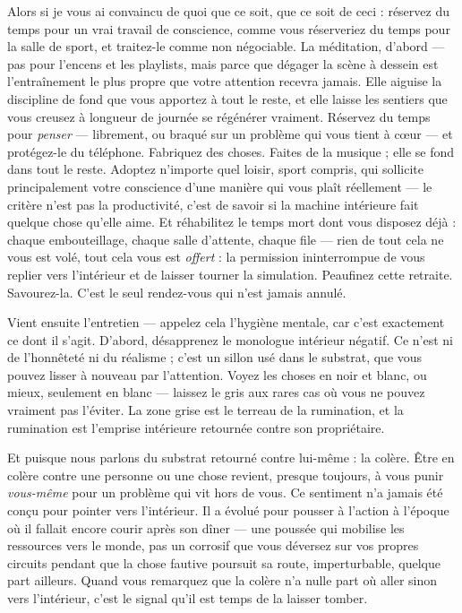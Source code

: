 \documentclass[11pt, twoside, openright]{book}
\begin{document}
Alors si je vous ai convaincu de quoi que ce soit, que ce soit de ceci : réservez du temps pour un vrai travail de conscience, comme vous réserveriez du temps pour la salle de sport, et traitez-le comme non négociable. La méditation, d'abord --- pas pour l'encens et les playlists, mais parce que dégager la scène à dessein est l'entraînement le plus propre que votre attention recevra jamais. Elle aiguise la discipline de fond que vous apportez à tout le reste, et elle laisse les sentiers que vous creusez à longueur de journée se régénérer vraiment. Réservez du temps pour \textit{penser} --- librement, ou braqué sur un problème qui vous tient à cœur --- et protégez-le du téléphone. Fabriquez des choses. Faites de la musique ; elle se fond dans tout le reste. Adoptez n'importe quel loisir, sport compris, qui sollicite principalement votre conscience d'une manière qui vous plaît réellement --- le critère n'est pas la productivité, c'est de savoir si la machine intérieure fait quelque chose qu'elle aime. Et réhabilitez le temps mort dont vous disposez déjà : chaque embouteillage, chaque salle d'attente, chaque file --- rien de tout cela ne vous est volé, tout cela vous est \textit{offert} : la permission ininterrompue de vous replier vers l'intérieur et de laisser tourner la simulation. Peaufinez cette retraite. Savourez-la. C'est le seul rendez-vous qui n'est jamais annulé.

Vient ensuite l'entretien --- appelez cela l'hygiène mentale, car c'est exactement ce dont il s'agit. D'abord, désapprenez le monologue intérieur négatif. Ce n'est ni de l'honnêteté ni du réalisme ; c'est un sillon usé dans le substrat, que vous pouvez lisser à nouveau par l'attention. Voyez les choses en noir et blanc, ou mieux, seulement en blanc --- laissez le gris aux rares cas où vous ne pouvez vraiment pas l'éviter. La zone grise est le terreau de la rumination, et la rumination est l'emprise intérieure retournée contre son propriétaire.

Et puisque nous parlons du substrat retourné contre lui-même : la colère. Être en colère contre une personne ou une chose revient, presque toujours, à vous punir \textit{vous-même} pour un problème qui vit hors de vous. Ce sentiment n'a jamais été conçu pour pointer vers l'intérieur. Il a évolué pour pousser à l'action à l'époque où il fallait encore courir après son dîner --- une poussée qui mobilise les ressources vers le monde, pas un corrosif que vous déversez sur vos propres circuits pendant que la chose fautive poursuit sa route, imperturbable, quelque part ailleurs. Quand vous remarquez que la colère n'a nulle part où aller sinon vers l'intérieur, c'est le signal qu'il est temps de la laisser tomber.
\end{document}

